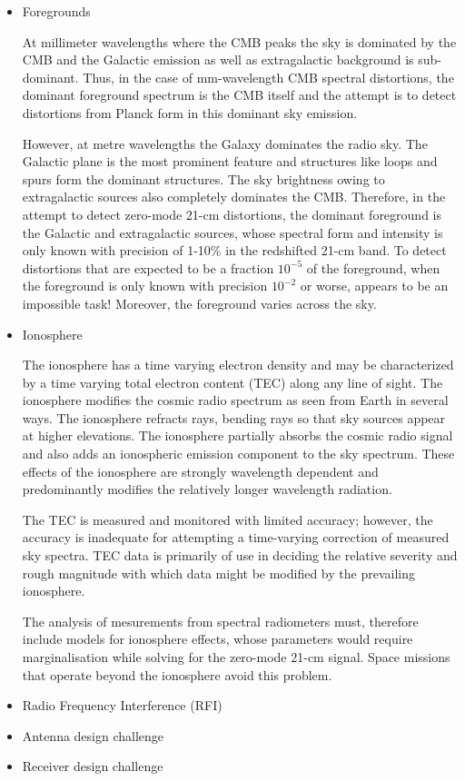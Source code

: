 \begin{itemize}

\item
Foregrounds

At millimeter wavelengths where the CMB peaks the sky is dominated by the CMB and the Galactic emission as well as extragalactic background is sub-dominant. Thus, in the case of mm-wavelength CMB spectral distortions, the dominant foreground spectrum is the CMB itself and the attempt is to detect distortions from Planck form in this dominant sky emission.

However, at metre wavelengths the Galaxy dominates the radio sky.  The Galactic plane is the most prominent feature and structures like loops and spurs form the dominant structures.  The sky brightness owing to extragalactic sources also completely dominates the CMB. Therefore, in the attempt to detect zero-mode 21-cm distortions, the dominant foreground is the Galactic and extragalactic sources, whose spectral form and intensity is only known with precision of 1-10\% in the redshifted 21-cm band.   To detect distortions that are expected to be a fraction $10^{-5}$ of the foreground, when the foreground is only known with precision $10^{-2}$ or worse, appears to be an impossible task!  Moreover, the foreground varies across the sky.

\item
Ionosphere

The ionosphere has a time varying electron density and may be characterized by a time varying total electron content (TEC) along any line of sight.  The ionosphere modifies the cosmic radio spectrum as seen from Earth in several ways. The ionosphere refracts rays, bending rays so that sky sources appear at higher elevations.  The ionosphere partially absorbs the cosmic radio signal and also adds an ionospheric emission component to the sky spectrum. These effects of the ionosphere are strongly wavelength dependent and predominantly modifies the relatively longer wavelength radiation.  

The TEC is measured and monitored with limited accuracy; however, the accuracy is inadequate for attempting a time-varying correction of measured sky spectra.  TEC data is primarily of use in deciding the relative severity and rough magnitude with which data might be modified by the prevailing ionosphere.  

The analysis of mesurements from spectral radiometers must, therefore include models for ionosphere effects, whose parameters would require marginalisation while solving for the zero-mode 21-cm signal.  Space missions that operate beyond the ionosphere avoid this problem.

\item
Radio Frequency Interference (RFI)

\item
Antenna design challenge

\item 
Receiver design challenge

\end{itemize}

